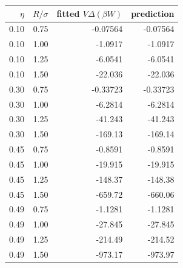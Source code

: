 \begin{tabular}{rrrr}
\toprule
$\eta$ & $R/\sigma$ & fitted $V\Delta(\beta W)$ & prediction \\
\midrule
0.10 & 0.75 & -0.07564 & -0.07564 \\
0.10 & 1.00 & -1.0917 & -1.0917 \\
0.10 & 1.25 & -6.0541 & -6.0541 \\
0.10 & 1.50 & -22.036 & -22.036 \\
0.30 & 0.75 & -0.33723 & -0.33723 \\
0.30 & 1.00 & -6.2814 & -6.2814 \\
0.30 & 1.25 & -41.243 & -41.243 \\
0.30 & 1.50 & -169.13 & -169.14 \\
0.45 & 0.75 & -0.8591 & -0.8591 \\
0.45 & 1.00 & -19.915 & -19.915 \\
0.45 & 1.25 & -148.37 & -148.38 \\
0.45 & 1.50 & -659.72 & -660.06 \\
0.49 & 0.75 & -1.1281 & -1.1281 \\
0.49 & 1.00 & -27.845 & -27.845 \\
0.49 & 1.25 & -214.49 & -214.52 \\
0.49 & 1.50 & -973.17 & -973.97 \\
\bottomrule
\end{tabular}
